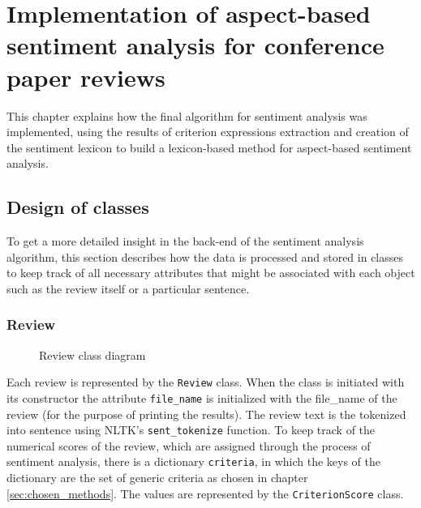 \chapter{Implementation of aspect-based sentiment analysis for conference paper reviews}
This chapter explains how the final algorithm for sentiment analysis was implemented, using the results of criterion expressions extraction and creation of the sentiment lexicon to build a lexicon-based method for aspect-based sentiment analysis. 
\section{Design of classes}
To get a more detailed insight in the back-end of the sentiment analysis algorithm, this section describes how the data is processed and stored in classes to keep track of all necessary attributes that might be associated with each object such as the review itself or a particular sentence.
 \subsection{Review}
 \begin{figure}[H]
\centering
{}

\caption{Review class diagram}
\label{img:review}
\end{figure}

Each review is represented by the \texttt{Review} class. When the class is initiated with its constructor the attribute \texttt{file\_name} is initialized with the file\_name of the review (for the purpose of printing the results). The review text is the tokenized into sentence using NLTK's \texttt{sent\_tokenize} function. To keep track of the numerical scores of the review, which are assigned through the process of sentiment analysis, there is a dictionary \texttt{criteria}, in which the keys of the dictionary are the set of generic criteria as chosen in chapter \ref{sec:chosen_methods}. The values are represented by the \texttt{CriterionScore} class.

